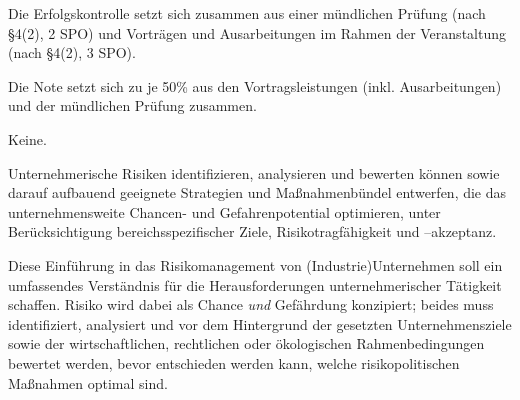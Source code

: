 \begin{course}

\setdoclanguagegerman
{}



\coursehead


\label{cour_5109.dp_997}


\begin{styleenv}
\begin{assessment}
Die Erfolgskontrolle setzt sich zusammen aus einer mündlichen Prüfung (nach §4(2), 2 SPO) und Vorträgen und Ausarbeitungen im Rahmen der Veranstaltung (nach §4(2), 3 SPO).

 

Die Note setzt sich zu je 50\% aus den Vortragsleistungen (inkl. Ausarbeitungen) und der mündlichen Prüfung zusammen.


\end{assessment}

\begin{conditions}Keine.\end{conditions}


\end{styleenv}

\begin{learningoutcomes}
Unternehmerische Risiken identifizieren, analysieren und bewerten können sowie darauf aufbauend geeignete Strategien und Maßnahmenbündel entwerfen, die das unternehmensweite Chancen- und Gefahrenpotential optimieren, unter Berücksichtigung bereichsspezifischer Ziele, Risikotragfähigkeit und –akzeptanz.


\end{learningoutcomes}

\begin{content}
Diese Einführung in das Risikomanagement von (Industrie)Unternehmen soll ein umfassendes Verständnis für die Herausforderungen unternehmerischer Tätigkeit schaffen. Risiko wird dabei als Chance \emph{und} Gefährdung konzipiert; beides muss identifiziert, analysiert und vor dem Hintergrund der gesetzten Unternehmensziele sowie der wirtschaftlichen, rechtlichen oder ökologischen Rahmenbedingungen bewertet werden, bevor entschieden werden kann, welche risikopolitischen Maßnahmen optimal sind.


\end{content}
\end{course}
